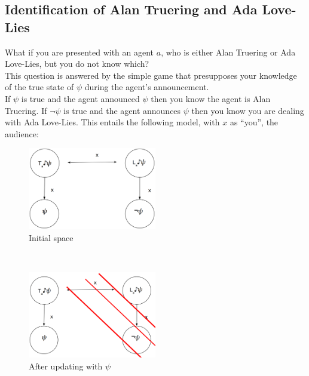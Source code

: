 \documentclass[12pt, titlepage, twoside, a4paper]{report}
\begin{document}
\subsection{Identification of Alan Truering and Ada Love-Lies}
What if you are presented with an agent $a$, who is either Alan Truering or Ada Love-Lies, but you do not know which?\\
This question is answered by the simple game that presupposes your knowledge of the true state of $\psi$ during the agent's announcement.\\
If $\psi$ is true and the agent announced $\psi$ then you know the agent is Alan Truering. If $\neg \psi$ is true and the agent announces $\psi$ then you know you are dealing with Ada Love-Lies.
This entails the following model, with $x$ as ``you'', the audience:
\begin{figure}[h!]
  \centering
  \includegraphics[width=0.5\textwidth]{slide10.eps}
  \caption{Initial space}
\end{figure}\\
\begin{figure}[h!]
  \centering
  \includegraphics[width=0.5\textwidth]{slide11.eps}
  \caption{After updating with $\psi$}
\end{figure}
\newpage
\end{document}
